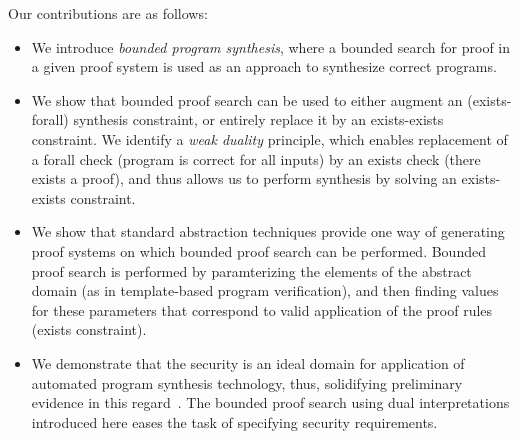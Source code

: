 \documentclass[preprint]{sig-alternate-05-2015}
\newcommand\ignore[1]{{}}
\begin{document}
\ignore{
In the usual notion of types, we have types
representing a set of concrete values.
We wish to go beyond this standard notion and
consider arbitrary user-defined entities that
behave like types, but that are not necessarily
related in any way to the concrete semantics of the program.
Let us call this more general notion {\em{dual values}}.
So, a program variable will be mapped to not only a value,
as in the usual semantics of programs, but also
simultaneously to a dual value.
Moreover, as in the case of types, 
this dual value does not correspond to
the result of a particular execution, 
but to a property that holds in every execution.
A user can not only program how values are updated
in a program, but also program the rules that govern
the update of dual values. 

%
The obvious question to ask here is why should one be
interested in programmable dual values and the dual
semantics that govern their behavior.
There are three main reasons:
(1) it provides a framework for using types-like 
constraints to prune search space in 
program synthesis, (2) it enables specification of
nonfunctional properties, and (3) it provides a new
way to think about program analysis and synthesis,
and helps provide theoretical clarity in that space.

\endignore}

Our contributions are as follows:
\begin{itemize}\itemsep=0em
    \item We  introduce {\em{bounded program synthesis}}, where
    a bounded search for proof in a given proof system 
    is used as an approach to synthesize correct programs.
  \item We show that bounded proof search can be used to
    either augment an (exists-forall) synthesis constraint, or 
    entirely replace it by an exists-exists constraint.  
    We identify a {\em{weak duality}} principle, which
    enables replacement of a forall check
    (program is correct for all inputs)
    by an exists check (there exists a proof),
    and thus allows us to perform
    synthesis by solving an exists-exists constraint.
  \item We show that standard abstraction techniques provide one
    way of generating proof systems on which bounded proof
    search can be performed. Bounded proof search is performed by 
    paramterizing
    the elements of the abstract domain (as in template-based
    program verification), and then 
    finding values for these parameters that correspond to valid
    application of the proof rules (exists constraint).
  \item We demonstrate that the security is an ideal
    domain for application of automated program synthesis technology,
    thus, solidifying preliminary evidence in this 
    regard~\cite{zoocrypt,DBLP:conf/csfw/MalozemoffKG14,TGD15:CADE,KatzBestPaper,BrentNew}.
    The bounded proof search using dual interpretations introduced here 
    eases the task of specifying security requirements.
\end{itemize}
\end{document}
